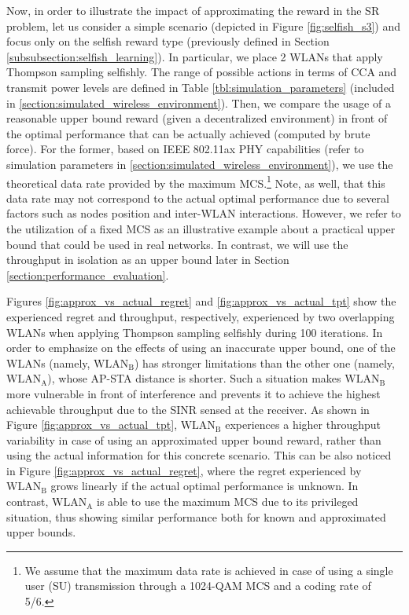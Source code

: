 \documentclass[preprint,12pt]{elsarticle}
\begin{document}
Now, in order to illustrate the impact of approximating the reward in the SR problem, let us consider a simple scenario (depicted in Figure \ref{fig:selfish_s3}) and focus only on the selfish reward type (previously defined in Section \ref{subsubsection:selfish_learning}). In particular, we place 2 WLANs that apply Thompson sampling selfishly. The range of possible actions in terms of CCA and transmit power levels are defined in Table \ref{tbl:simulation_parameters} (included in \ref{section:simulated_wireless_environment}). Then, we compare the usage of a reasonable upper bound reward (given a decentralized environment) in front of the optimal performance that can be actually achieved (computed by brute force). For the former, based on IEEE 802.11ax PHY capabilities (refer to simulation parameters in \ref{section:simulated_wireless_environment}), we use the theoretical data rate provided by the maximum MCS.\footnote{We assume that the maximum data rate is achieved in case of using a single user (SU) transmission through a 1024-QAM MCS and a coding rate of 5/6.} Note, as well, that this data rate may not correspond to the actual optimal performance due to several factors such as nodes position and inter-WLAN interactions. However, we refer to the utilization of a fixed MCS as an illustrative example about a practical upper bound that could be used in real networks. In contrast, we will use the throughput in isolation as an upper bound later in Section \ref{section:performance_evaluation}.

Figures \ref{fig:approx_vs_actual_regret} and \ref{fig:approx_vs_actual_tpt} show the experienced regret and throughput, respectively, experienced by two overlapping WLANs when applying Thompson sampling selfishly during 100 iterations. In order to emphasize on the effects of using an inaccurate upper bound, one of the WLANs (namely, $\text{WLAN}_\text{B}$) has stronger limitations than the other one (namely, $\text{WLAN}_\text{A}$), whose AP-STA distance is shorter. Such a situation makes $\text{WLAN}_\text{B}$ more vulnerable in front of interference and prevents it to achieve the highest achievable throughput due to the SINR sensed at the receiver. As shown in Figure \ref{fig:approx_vs_actual_tpt}, $\text{WLAN}_\text{B}$ experiences a higher throughput variability in case of using an approximated upper bound reward, rather than using the actual information for this concrete scenario. This can be also noticed in Figure \ref{fig:approx_vs_actual_regret}, where the regret experienced by $\text{WLAN}_\text{B}$ grows linearly if the actual optimal performance is unknown. In contrast, $\text{WLAN}_\text{A}$ is able to use the maximum MCS due to its privileged situation, thus showing similar performance both for known and approximated upper bounds. 	
\end{document}
